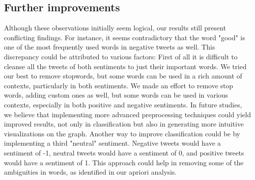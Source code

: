\documentclass[11pt,a4paper]{article}
\begin{document}
\subsection{Further improvements}
Although these observations initially seem logical, our results still present conflicting findings. For instance, it seems contradictory that the word "good" is one of the most frequently used words in negative tweets as well. This discrepancy could be attributed to various factors: First of all it is difficult to cleanse all the tweets of both sentiments to just their important words. We tried our best to remove stopwords, but some words can be used in a rich amount of contexts, particularly in both sentiments. We made an effort to remove stop words, adding custom ones as well, but some words can be used in various contexts, especially in both positive and negative sentiments. In future studies, we believe that implementing more advanced preprocessing techniques could yield improved results, not only in classification but also in generating more intuitive visualizations on the graph. Another way to improve classification could be by implementing a third "neutral" sentiment. Negative tweets would have a sentiment of -1, neutral tweets would have a sentiment of 0, and positive tweets would have a sentiment of 1\cite{twitter-sentiment-analysis2}. This approach could help in removing some of the ambiguities in words, as identified in our apriori analysis.


\end{document}
